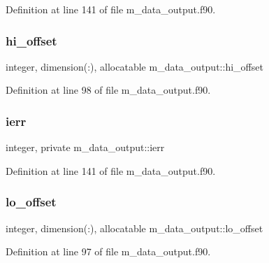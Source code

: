Definition at line 141 of file m\+\_\+data\+\_\+output.\+f90.

\mbox{\label{namespacem__data__output_a1a779679774e1161511609f18e8d9c27}} 
\subsubsection{\texorpdfstring{hi\+\_\+offset}{hi\_offset}}
{\footnotesize\ttfamily integer, dimension(\+:), allocatable m\+\_\+data\+\_\+output\+::hi\+\_\+offset}



Definition at line 98 of file m\+\_\+data\+\_\+output.\+f90.

\mbox{\label{namespacem__data__output_afa88ae36e1e20ff64867261ef6c9be15}} 
\subsubsection{\texorpdfstring{ierr}{ierr}}
{\footnotesize\ttfamily integer, private m\+\_\+data\+\_\+output\+::ierr\hspace{0.3cm}{\ttfamily [private]}}



Definition at line 141 of file m\+\_\+data\+\_\+output.\+f90.

\mbox{\label{namespacem__data__output_a4b7e6567b3bb7fdd4384180d1a7475af}} 
\subsubsection{\texorpdfstring{lo\+\_\+offset}{lo\_offset}}
{\footnotesize\ttfamily integer, dimension(\+:), allocatable m\+\_\+data\+\_\+output\+::lo\+\_\+offset}



Definition at line 97 of file m\+\_\+data\+\_\+output.\+f90.

